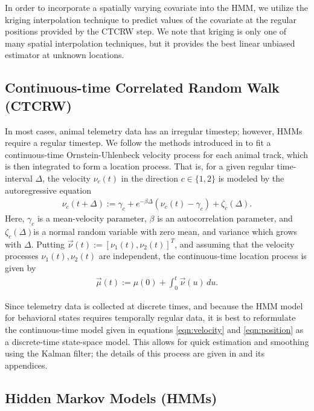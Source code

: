 \documentclass[12pt]{article}
\begin{document}
	 In order to incorporate a spatially varying covariate into the HMM, we utilize the kriging interpolation technique to predict values of the covariate at the regular positions provided by the CTCRW step. We note that kriging is only one of many spatial interpolation techniques, but it provides the best linear unbiased estimator at unknown locations.
	
	\subsection{Continuous-time Correlated Random Walk (CTCRW)} \label{sec:ctcrw}
	
	In most cases, animal telemetry data has an irregular timestep; however, HMMs require a regular timestep. We follow the methods introduced in \cite{Johnson2008} to fit a continuous-time Ornstein-Uhlenbeck velocity process for each animal track, which is then integrated to form a location process. That is, for a given regular time-interval $\Delta$, the velocity $\nu_c(t)$ in the direction $c \in \{1, 2\}$ is modeled by the autoregressive equation
	\begin{align}
		\nu_c(t + \Delta) := \gamma_c + e^{-\beta \Delta} (\nu_c(t) - \gamma_c) + \zeta_c(\Delta). \label{eqn:velocity}
	\end{align}
	Here, $\gamma_c$ is a mean-velocity parameter, $\beta$ is an autocorrelation parameter, and $\zeta_c(\Delta)$is a normal random variable with zero mean, and variance which grows with $\Delta$. Putting $\vec \nu(t) := [\nu_1(t), \nu_2(t)]^T$, and assuming that the velocity processes $\nu_1(t), \nu_2(t)$ are independent, the continuous-time location process is given by
	\begin{align}
		\vec \mu(t) := \mu(0) + \int_0^t \vec \nu(u) \, du. \label{eqn:position}
	\end{align}
	
	Since telemetry data is collected at discrete times, and because the HMM model for behavioral states requires temporally regular data, it is best to reformulate the continuous-time model given in equations \eqref{eqn:velocity} and \eqref{eqn:position} as a discrete-time state-space model. This allows for quick estimation and smoothing using the Kalman filter; the details of this process are given in \cite{Johnson2008} and its appendices.
	
	\subsection{Hidden Markov Models (HMMs)} \label{sec:hmm}
	
\end{document}
